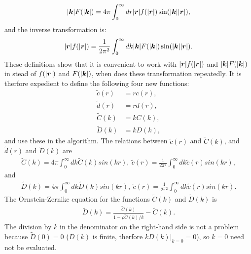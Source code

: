 \begin{align}
|\boldsymbol{k}|F(|\boldsymbol{k}|) = 4 \pi \int_0^\infty dr |\boldsymbol{r}| f(|\boldsymbol{r}|) \sin(|\boldsymbol{k}||\boldsymbol{r}|),
\end{align}
and the inverse transformation is:
\begin{align}
|\boldsymbol{r}|f(|\boldsymbol{r}|) = \frac{1}{2 \pi^2} \int_0^\infty dk |\boldsymbol{k}| F(|\boldsymbol{k}|) \sin(|\boldsymbol{k}||\boldsymbol{r}|).
\end{align}
These definitions show that it is convenient to work with $|\boldsymbol{r}|f(|\boldsymbol{r}|)$ and $|\boldsymbol{k}|F(|\boldsymbol{k}|)$ in stead of $f(|\boldsymbol{r}|)$ and $F(|\boldsymbol{k}|)$, when does these transformation repeatedly.
It is therfore expedient to define the following four new functions:
\begin{align}
\tilde{c}(r) &= r c(r), \\
\tilde{d}(r) &= r d(r), \\
\tilde{C}(k) &= k C(k), \\
\tilde{D}(k) &= k D(k),
\end{align}
and use these in the algorithm.
The relations between $\tilde{c}(r)$ and $\tilde{C}(k)$, and
$\tilde{d}(r)$ and $\tilde{D}(k)$ are
\begin{align}\label{eq:c_tilde_ft_pair}
\tilde{C}(k) = 4 \pi \int_0^\infty dk 
    \tilde{C}(k) sin(k r), ~
\tilde{c}(r) = \frac{1}{2 \pi^2} \int_0^\infty dk 
    \tilde{c}(r) sin(k r),
\end{align}
and
\begin{align}\label{eq:d_tilde_ft_pair}
\tilde{D}(k) = 4 \pi \int_0^\infty dk 
    \tilde{D}(k) sin(k r), ~
\tilde{c}(r) = \frac{1}{2 \pi^2} \int_0^\infty dk 
    \tilde{c}(r) sin(k r).
\end{align}
The Ornstein-Zernike equation for the functions $\tilde{C}(k)$ and $\tilde{D}(k)$ is
\begin{align}\label{eq:oz_D_tilde_C_tilde}
\tilde{D}(k) = \frac{\tilde{C}(k)}{1-\rho \tilde{C}(k)/k}
    - \tilde{C}(k).
\end{align}
The division by $k$ in the denominator on the right-hand side
is not a problem because $\tilde{D}(0) = 0$ ($D(k)$ is finite, therfore $kD(k)|_{k=0}=0$), so $k=0$ need not be evaluated.

